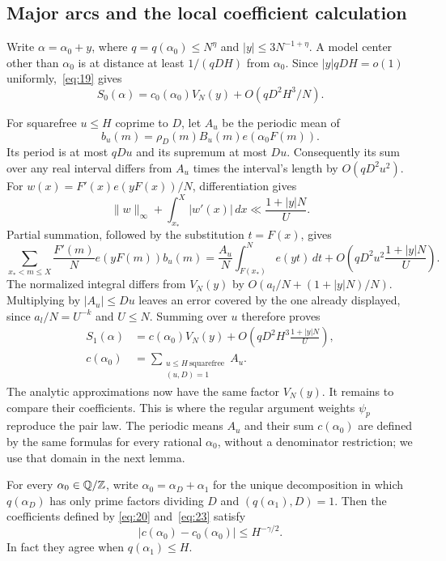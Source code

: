 \subsection{Major arcs and the local coefficient calculation}

Write $\alpha=\alpha_0+y$, where
$q=q(\alpha_0)\le N^\eta$ and $|y|\le3N^{-1+\eta}$. A model center
other than $\alpha_0$ is at distance at least $1/(qDH)$ from
$\alpha_0$. Since $|y|qDH=o(1)$ uniformly,~\eqref{eq:19} gives
\[
 S_0(\alpha)=c_0(\alpha_0)V_N(y)+O(qD^2H^3/N).
\]

For squarefree $u\le H$ coprime to $D$, let $A_u$ be the periodic
mean of
\[
 b_u(m)=\rho_D(m)B_u(m)e(\alpha_0F(m)).
\]
Its period is at most $qDu$ and its supremum at most $Du$.
Consequently its sum over any real interval differs from $A_u$ times
the interval's length by $O(qD^2u^2)$. For
$w(x)=F'(x)e(yF(x))/N$, differentiation gives
\[
 \|w\|_\infty+\int_{x_*}^{X}|w'(x)|\,dx
 \ll\frac{1+|y|N}{U}.
\]
Partial summation, followed by the substitution $t=F(x)$, gives
\[
 \sum_{x_*<m\le X}\frac{F'(m)}N e(yF(m))b_u(m)
 =\frac{A_u}{N}\int_{F(x_*)}^{N}e(yt)\,dt
    +O\!\left(qD^2u^2\frac{1+|y|N}{U}\right).
\]
The normalized integral differs from $V_N(y)$ by
$O(a_l/N+(1+|y|N)/N)$. Multiplying by $|A_u|\le Du$ leaves an error
covered by the one already displayed, since $a_l/N=U^{-k}$ and
$U\le N$. Summing over $u$ therefore proves
\begin{equation}
 \begin{split}
 S_1(\alpha)&=c(\alpha_0)V_N(y)
       +O\!\left(qD^2H^3\frac{1+|y|N}{U}\right),\\
 c(\alpha_0)&=\sum_{\substack{u\le H\ \mathrm{squarefree}\\(u,D)=1}}A_u.
 \end{split}
 \label{eq:23}
\end{equation}
The analytic approximations now have the same factor $V_N(y)$.
It remains to compare their coefficients. This is where the regular
argument weights $\psi_p$ reproduce the pair law.
The periodic means $A_u$ and their sum $c(\alpha_0)$ are defined by
the same formulas for every rational $\alpha_0$, without a denominator
restriction; we use that domain in the next lemma.

\begin{lemma}
\label{kernel:coefficients}
For every $\alpha_0\in\mathbb Q/\mathbb Z$, write $\alpha_0=\alpha_D+\alpha_1$ for the
unique decomposition in which $q(\alpha_D)$ has only prime factors dividing
$D$ and $(q(\alpha_1),D)=1$. Then the coefficients defined by
\eqref{eq:20} and~\eqref{eq:23} satisfy
\[
 |c(\alpha_0)-c_0(\alpha_0)|\le H^{-\gamma/2}.
\]
In fact they agree when $q(\alpha_1)\le H$.
\end{lemma}

